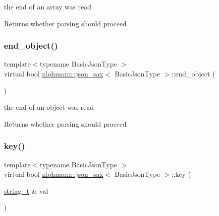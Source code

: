 the end of an array was read 

\begin{DoxyReturn}{Returns}
whether parsing should proceed 
\end{DoxyReturn}
\mbox{\label{structnlohmann_1_1json__sax_ad0c722d53ff97be700ccf6a9468bd456}} 
\subsubsection{\texorpdfstring{end\_object()}{end\_object()}}
{\footnotesize\ttfamily template$<$typename Basic\+Json\+Type $>$ \\
virtual bool \mbox{\hyperlink{structnlohmann_1_1json__sax}{nlohmann\+::json\+\_\+sax}}$<$ Basic\+Json\+Type $>$\+::end\+\_\+object (\begin{DoxyParamCaption}{ }\end{DoxyParamCaption})\hspace{0.3cm}{\ttfamily [pure virtual]}}



the end of an object was read 

\begin{DoxyReturn}{Returns}
whether parsing should proceed 
\end{DoxyReturn}
\mbox{\label{structnlohmann_1_1json__sax_a2e0c7ecd80b18d18a8cc76f71cfc2028}} 
\subsubsection{\texorpdfstring{key()}{key()}}
{\footnotesize\ttfamily template$<$typename Basic\+Json\+Type $>$ \\
virtual bool \mbox{\hyperlink{structnlohmann_1_1json__sax}{nlohmann\+::json\+\_\+sax}}$<$ Basic\+Json\+Type $>$\+::key (\begin{DoxyParamCaption}\item[{\mbox{\hyperlink{structnlohmann_1_1json__sax_ae01977a9f3c5b3667b7a2929ed91061e}{string\+\_\+t}} \&}]{val }\end{DoxyParamCaption})\hspace{0.3cm}{\ttfamily [pure virtual]}}



